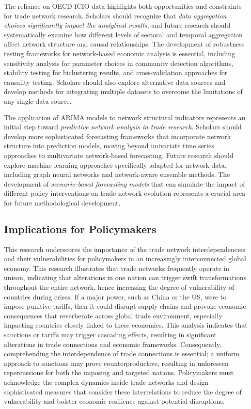 \documentclass[preprint, 3p,
authoryear]{elsarticle} %
\begin{document}
The reliance on OECD ICIO data highlights both opportunities and
constraints for trade network research. Scholars should recognize that
\emph{data aggregation choices significantly impact the analytical
results}, and future research should systematically examine how
different levels of sectoral and temporal aggregation affect network
structure and causal relationships. The development of robustness
testing frameworks for network-based economic analysis is essential,
including sensitivity analysis for parameter choices in community
detection algorithms, stability testing for biclustering results, and
cross-validation approaches for causality testing. Scholars should also
explore alternative data sources and develop methods for integrating
multiple datasets to overcome the limitations of any single data source.

The application of ARIMA models to network structural indicators
represents an initial step toward \emph{predictive network analysis in
trade research}. Scholars should develop more sophisticated forecasting
frameworks that incorporate network structure into prediction models,
moving beyond univariate time series approaches to multivariate
network-based forecasting. Future research should explore machine
learning approaches specifically adapted for network data, including
graph neural networks and network-aware ensemble methods. The
development of \emph{scenario-based forecasting models} that can
simulate the impact of different policy interventions on trade network
evolution represents a crucial area for future methodological
development.

\subsection{Implications for
Policymakers}\label{implications-for-policymakers}

This research underscores the importance of the trade network
interdependencies and their vulnerabilities for policymakers in an
increasingly interconnected global economy. This research illustrates
that trade networks frequently operate in unison, indicating that
alterations in one nation can trigger swift transformations throughout
the entire network, hence increasing the degree of vulnerability of
countries during crises. If a major power, such as China or the US, were
to impose punitive tariffs, then it could disrupt supply chains and
provoke economic consequences that reverberate across global trade
environment, especially impacting countries closely linked to these
economies. This analysis indicates that sanctions or tariffs may trigger
cascading effects, resulting in significant alterations in trade
connections and economic frameworks. Consequently, comprehending the
interdependence of trade connections is essential; a uniform approach to
sanctions may prove counterproductive, resulting in unforeseen
repercussions for both the imposing and targeted nations. Policymakers
must acknowledge the complex dynamics inside trade networks and design
sophisticated measures that consider these interrelations to reduce the
degree of vulnerability and bolster economic resilience against
potential disruptions.
\end{document}
